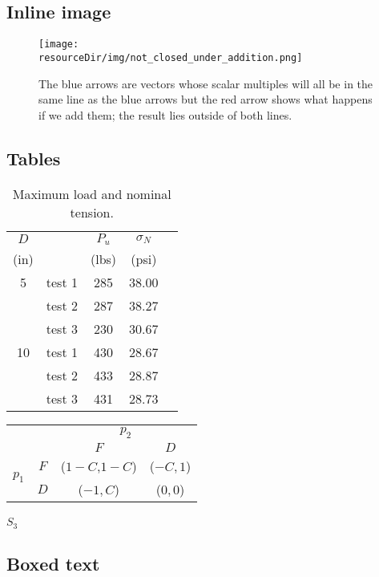 \documentclass[MathsNotesBase.tex]{subfiles}
\begin{document}
	\subsection{Inline image}
	\begin{figure}[h!]
		\texttt{[image: \\resourceDir/img/not\_closed\_under\_addition.png]}
		\caption{The blue arrows are vectors whose scalar multiples will all be in the same line as the blue arrows but the red arrow shows what happens if we add them; the result lies outside of both lines.}
	\end{figure}
	
	\subsection{Tables}
	\begin{table}[h!]%
		\caption{Maximum load and nominal tension.}
		\label{aggiungi}\centering%
		\begin{tabular}{clccc}
			\toprule%
			$D$ & & $P_u$ & $\sigma_N$ \\
			(in)& &(lbs) & (psi) \\ \toprule%
			5 & test 1 & 285 & 38.00 \\
			& test 2 & 287 & 38.27 \\
			& test 3 & 230 & 30.67 \\ \midrule
			10 & test 1 & 430 & 28.67 \\
			& test 2 & 433 & 28.87 \\
			& test 3 & 431 & 28.73 \\ \bottomrule
		\end{tabular}
	\end{table}
	
	\begin{tabular}[h!]{*4c}
		& &\multicolumn{2}{c}{$p_{2}$}\\
		& & $F$ &$D$ \\\cline{3-4}
		\multirow{2}{*}{$p_{1}$}& $F$ & \multicolumn{1}{|c|}{($1-C$,$1-C$)} & \multicolumn{1}{c|}{($-C,1$)} \\\cline{3-4}
		& $D$ & \multicolumn{1}{|c|}{($-1,C$)} &\multicolumn{1}{c|}{($0,0$)}\\\cline{3-4}
	\end{tabular}
	\subparagraph{$S_3$}
	
	\subsection{Boxed text}
	\noindent{}\bigskip
\end{document}
